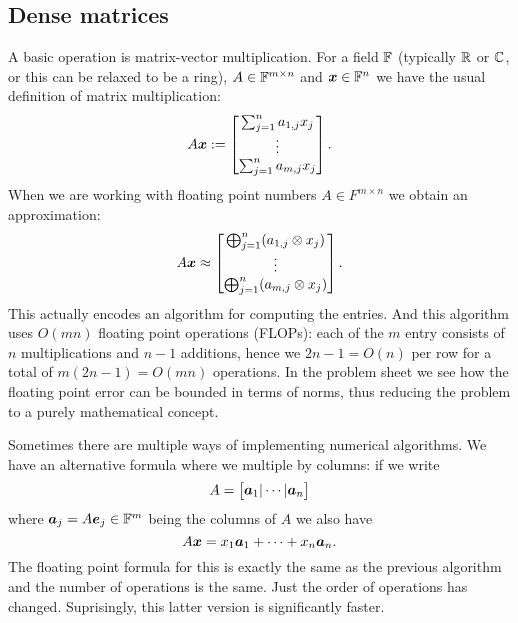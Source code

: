 \subsection{Dense matrices}
A basic operation is matrix-vector multiplication. For a field ${\mathbb F}$ (typically ${\mathbb R}$ or ${\mathbb C}$, or this can be relaxed to be a ring), $A \in {\mathbb F}^{m \times n}$ and $\bm{{\mbox{\boldmath$x$\unboldmath}}} \in {\mathbb F}^n$ we have the usual definition of matrix multiplication:
\[
A\bm{{\mbox{\boldmath$x$\unboldmath}}} := \begin{bmatrix} \sum_{j=1}^n a_{1,j} x_j \\ \vdots \\ \sum_{j=1}^n a_{m,j} x_j \end{bmatrix}.
\]
When we are working with floating point numbers $A \ensuremath{\in} F^{m \ensuremath{\times} n}$ we obtain an approximation:
\[
A\bm{{\mbox{\boldmath$x$\unboldmath}}} \approx \begin{bmatrix} \bigoplus_{j=1}^n (a_{1,j}  \otimes x_j) \\ \vdots \\  \bigoplus_{j=1}^n (a_{m,j}  \otimes x_j) \end{bmatrix}.
\]
This actually encodes an algorithm for computing the entries. And this algorithm uses $O(m n)$ floating point operations (FLOPs): each of the $m$ entry consists of $n$ multiplications and $n-1$ additions, hence we $2n-1 = O(n)$ per row for a total of $m(2n-1) = O(mn)$ operations. In the problem sheet we see how the floating point error can be bounded in terms of norms, thus reducing the problem to a purely mathematical concept.

Sometimes there are multiple ways of implementing numerical algorithms. We have an alternative formula where we multiple by columns: if we write
\[
A = \begin{bmatrix} \bm{{\mbox{\boldmath$a$\unboldmath}}}_1 | \cdots | \bm{{\mbox{\boldmath$a$\unboldmath}}}_n \end{bmatrix}
\]
where $\bm{{\mbox{\boldmath$a$\unboldmath}}}_j = A \bm{{\mbox{\boldmath$e$\unboldmath}}}_j \in {\mathbb F}^m$ being the columns of $A$ we also have
\[
A \bm{{\mbox{\boldmath$x$\unboldmath}}} = x_1 \bm{{\mbox{\boldmath$a$\unboldmath}}}_1  + \cdots + x_n \bm{{\mbox{\boldmath$a$\unboldmath}}}_n.
\]
The floating point formula for this is exactly the same as the previous algorithm and the number of operations is the same. Just the order of operations has changed.  Suprisingly, this latter version is significantly faster.

